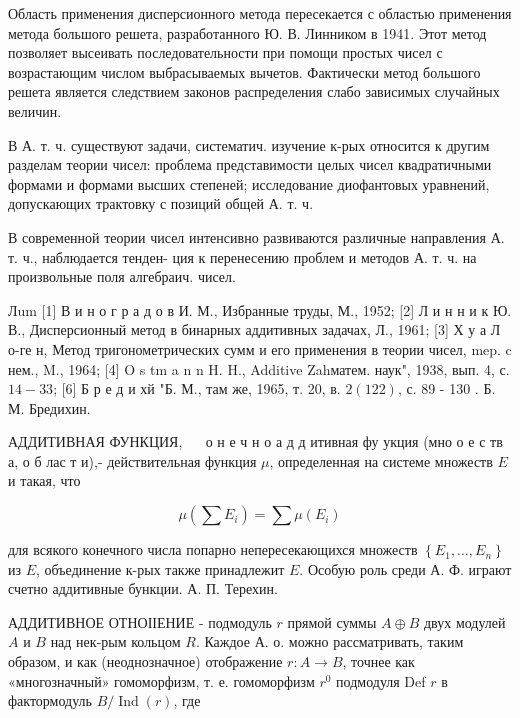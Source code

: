 \documentclass[10pt]{article}
\begin{document}
Область применения дисперсионного метода пересекается с областью применения метода большого решета, разработанного Ю. В. Линником в 1941. Этот метод позволяет высеивать последовательности при помощи простых чисел с возрастающим числом выбрасываемых вычетов. Фактически метод большого решета является следствием законов распределения слабо зависимых случайных величин.



В А. т. ч. существуют задачи, систематич. изучение к-рых относится к другим разделам теории чисел: проблема представимости целых чисел квадратичными формами и формами высших степеней; исследование диофантовых уравнений, допускающих трактовку с позиций общей А. т. ч.



В современной теории чисел интенсивно развиваются различные направления А. т. ч., наблюдается тенден- ция к перенесению проблем и методов А. т. ч. на произвольные поля алгебраич. чисел.



Лum [1] В и н о г р а д о в И. М., Избранные труды, М., 1952; [2] Л и н н и к Ю. В., Дисперсионный метод в бинарных аддитивных задачах, Л., 1961; [3] Х у а Л о-ге н, Метод тригонометрических сумм и его применения в теории чисел, mep. c нем., M., 1964; [4] O s tm a n n H. H., Additive Zahматем. наук", 1938, вып. 4, с. $14-33$; [6] Б р е д и хй "Б. М., там же, 1965, т. 20, в. $2(122)$, с. 89 - 130 . Б. М. Бредихин.



АДДИТИВНАЯ ФУНКЦИЯ, $\quad$ о н е ч н $о$ а д д итивная фу укция (мно о е с тв а, о б лас т и),- действительная функция $\mu$, определенная на системе множеств $E$ и такая, что



\[

\mu\left(\sum E_{i}\right)=\sum \mu\left(E_{i}\right)

\]



для всякого конечного числа попарно непересекающихся множеств $\left\{E_{1}, \ldots, E_{n}\right\}$ из $E$, объединение к-рых также принадлежит $E$. Особую роль среди А. Ф. играют счетно аддитивные бункции. А. П. Терехин.



АДДИТИВНОЕ ОТНОІІЕНИЕ - подмодуль $r$ прямой суммы $A \oplus B$ двух модулей $A$ и $B$ над нек-рым кольцом $R$. Каждое А. о. можно рассматривать, таким образом, и как (неоднозначное) отображение $r: A \rightarrow B$, точнее как «многозначный» гомоморфизм, т. е. гомоморфизм $r^{0}$ подмодуля Def $r$ в фактормодуль $B / \operatorname{Ind}(r)$, где
\end{document}
